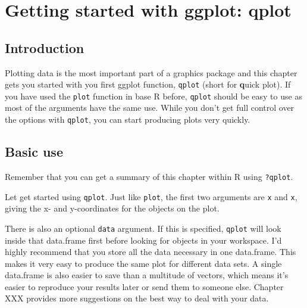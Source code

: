 


\dominitoc \faketableofcontents

\chapter{Getting started with ggplot: qplot}


\section{Introduction}

Plotting data is the most important part of a graphics package and this chapter gets you started with you first ggplot function, {\tt qplot} (short for {\bf q}uick plot).  If you have used the {\tt plot} function in base R before, {\tt qplot} should be easy to use as most of the arguments have the same use.  While you don't get full control over the options with {\tt qplot}, you can start producing plots very quickly. 

\section{Basic use}\label{sec:basic_use}

Remember that you can get a summary of this chapter within R using {\tt ?qplot}.

Let get started using {\tt qplot}.  Just like {\tt plot}, the first two arguments are {\tt x} and {\tt x}, giving the x- and y-coordinates for the objects on the plot.  

There is also an optional {\tt data} argument.  If this is specified, {\tt qplot} will look inside that data.frame first before looking for objects in your workspace.  I'd highly recommend that you store all the data necessary in one data.frame.  This makes it very easy to produce the same plot for different data sets.  A single data.frame is also easier to save than a multitude of vectors, which means it's easier to reproduce your results later or send them to someone else.  Chapter XXX provides more suggestions on the best way to deal with your data.  

